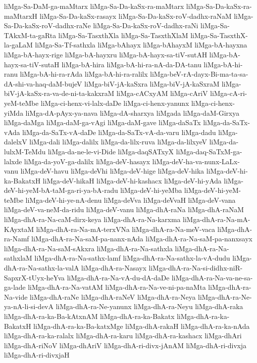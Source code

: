 {liMga-Sa-DaM-ga-maMtarx
liMga-Sa-Da-kaSx-ra-maMtarx
liMga-Sa-Da-kaSx-ra-maMtarxH
liMga-Sa-Da-kaSx-rasayx
liMga-Sa-Da-kaSx-roV-dadhx-raNaM
liMga-Sa-Da-kaSx-roV-dadhx-raNe
liMga-Sa-Da-kaSx-roV-dadhx-raNi
liMga-Sa-TAkxM-ta-gaRta
liMga-Sa-TasxthXla
liMga-Sa-TasxthXlaM
liMga-Sa-TasxthX-la-gaLaM
liMga-Sa-Tf-sathxla
liMga-bAhayx
liMga-bAhayxM
liMga-bA-hayxna
liMga-bA-hayx-rige
liMga-bA-hayxru
liMga-bA-hayx-sa-tiV-sutAH
liMga-bA-hayx-sa-tiV-sutaH
liMga-bA-hira
liMga-bA-hi-ra-nA-da-DA-tanu
liMga-bA-hi-ranu
liMga-bA-hi-ra-rAda
liMga-bA-hi-ra-ralilx
liMga-beV-rA-dayx-Bi-ma-ta-sa-dA-shi-va-haq-daM-bujeV
liMga-biV-jA-kaSxra
liMga-biV-jA-kaSxraM
liMga-biV-jA-kaSx-ra-va-de-ni-ta-kakxraM
liMga-cACxyAM
liMga-cAriV
liMga-cA-ri-yeM-teMbe
liMga-ci-henx-vi-lalx-daDe
liMga-ci-henx-yanunx
liMga-ci-henx-yiMda
liMga-dA-pAyx-ya-nava
liMga-dA-sharxya
liMgada
liMga-daM-Girxya
liMga-daMga
liMga-daM-ga-vAgi
liMga-daM-gave
liMga-daSaTx
liMga-da-SaTx-vAda
liMga-da-SaTx-vA-daDe
liMga-da-SaTx-vA-da-varu
liMga-dadu
liMga-dalelxV
liMga-dali
liMga-dalilx
liMga-da-lilx-ruva
liMga-da-lilxyeV
liMga-da-lulxM-TeMdu
liMga-da-ne-le-vi-Dide
liMga-daqSATxyX
liMga-daq-SaTxM-ga-lalxde
liMga-da-yoV-ga-dalilx
liMga-deV-hasayx
liMga-deV-ha-va-nunx-LaLx-vanu
liMga-deV-havu
liMga-deVhi
liMga-deV-hige
liMga-deV-hika
liMga-deV-hi-ka-BakatxH
liMga-deV-hikaH
liMga-deV-hi-kashacx
liMga-deV-hi-yAda
liMga-deV-hi-yeM-bA-taM-ga-ri-ya-bA-radu
liMga-deV-hi-yeMba
liMga-deV-hi-yeM-teMbe
liMga-deV-hi-ye-nA-denu
liMga-deVva
liMga-deVvaH
liMga-deV-vana
liMga-deV-va-neM-da-ridu
liMga-deV-vanu
liMga-dhA-raNa
liMga-dhA-raNaM
liMga-dhA-ra-Na-caM-dirx-keya
liMga-dhA-ra-Na-karxma
liMga-dhA-ra-Na-mA-KAyxtaM
liMga-dhA-ra-Na-mA-terxVNa
liMga-dhA-ra-Na-meV-vaca
liMga-dhA-ra-Namf
liMga-dhA-ra-Na-saM-pa-nanx-nAda
liMga-dhA-ra-Na-saM-pa-nanxsayx
liMga-dhA-ra-Na-saM-sAkxra
liMga-dhA-ra-Na-sathxla
liMga-dhA-ra-Na-sathxlaM
liMga-dhA-ra-Na-sathx-lamf
liMga-dhA-ra-Na-sathx-la-vA-dudu
liMga-dhA-ra-Na-sathx-la-valA
liMga-dhA-ra-Nasayx
liMga-dhA-ra-Na-si-didhx-niR-SapxrX-tUyx-heYva
liMga-dhA-ra-Na-vA-du-dA-daDe
liMga-dhA-ra-Na-va-ne-sa-ga-lade
liMga-dhA-ra-Na-vatAM
liMga-dhA-ra-Na-ve-ni-pa-naMta
liMga-dhA-ra-Na-vide
liMga-dhA-raNe
liMga-dhA-raNeV
liMga-dhA-ra-Neya
liMga-dhA-ra-Ne-ya-nA-li-si-devA
liMga-dhA-ra-Ne-yanunx
liMga-dhA-ra-Neyu
liMga-dhA-raka
liMga-dhA-ra-ka-Ba-kAtxnAM
liMga-dhA-ra-ka-Bakatx
liMga-dhA-ra-ka-BakatxH
liMga-dhA-ra-ka-Ba-katxMge
liMga-dhA-rakaH
liMga-dhA-ra-ka-nAda
liMga-dhA-ra-ka-ralalx
liMga-dhA-ra-karu
liMga-dhA-ra-kashacx
liMga-dhAri
liMga-dhA-riNoV
liMga-dhAriV
liMga-dhA-ri-divx-jAnAM
liMga-dhA-ri-divxja
liMga-dhA-ri-divxjaH
}
